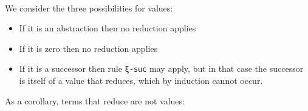 \begin{fence}
\begin{code}%
\>[0]\AgdaSpace{}%
\AgdaSymbol{:}\AgdaSpace{}%
\AgdaSpace{}%
\AgdaSymbol{\{}\AgdaSpace{}%
\AgdaSymbol{\}}\<%
\\
\>[0][@{}l@{\AgdaIndent{0}}]%
\>[2]%
\>[61I]\AgdaSpace{}%
\<%
\\
\>[.][@{}l@{}]\<[61I]%
\>[4]\AgdaComment{----------}\<%
\\
%
\>[2]\AgdaSpace{}%
\AgdaSpace{}%
\AgdaSymbol{(}\AgdaSpace{}%
\AgdaSpace{}%
\AgdaSymbol{)}\<%
\\
\>[0]\AgdaSpace{}%
%
\>[16]\AgdaSymbol{()}\<%
\\
\>[0]\AgdaSpace{}%
%
\>[16]\AgdaSymbol{()}\<%
\\
\>[0]\AgdaSpace{}%
\AgdaSymbol{(}\AgdaSpace{}%
\AgdaSymbol{)}\AgdaSpace{}%
\AgdaSymbol{(}\AgdaSpace{}%
\AgdaSymbol{)}\AgdaSpace{}%
\AgdaSymbol{=}\AgdaSpace{}%
\AgdaSpace{}%
\AgdaSpace{}%
\<%
\end{code}
\end{fence}

We consider the three possibilities for values:

\begin{itemize}
\item
  If it is an abstraction then no reduction applies
\item
  If it is zero then no reduction applies
\item
  If it is a successor then rule \texttt{ξ-suc} may apply, but in that
  case the successor is itself of a value that reduces, which by
  induction cannot occur.
\end{itemize}

As a corollary, terms that reduce are not values:

